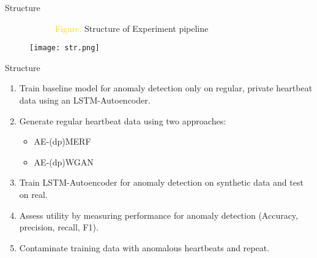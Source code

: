 \begin{frame}{Structure}
    
    \begin{figure}[h]
        \begin{flushleft}
            ~~~~~~\textcolor{gold}{Figure: }Structure of Experiment pipeline
        \end{flushleft}
        \centering
        \texttt{[image: str.png]}
    \end{figure}
\end{frame}

\begin{frame}{Structure}
    \begin{enumerate}
        \item<1-> Train \alert{baseline model} for anomaly detection only on \alert{regular, private heartbeat data} using an LSTM-Autoencoder.
        \item<2->  \alert{Generate regular heartbeat} data using two approaches:
        \begin{itemize}
            \item<2-> [--] AE-(dp)MERF
            \item<2-> [--] AE-(dp)WGAN
        \end{itemize}
        \item<3->  Train LSTM-Autoencoder for \alert{anomaly detection on synthetic data} and \alert{test on real}.
        \item<3-> Assess \alert{utility} by measuring performance for anomaly detection (Accuracy, precision, recall, F1). 
        \item<4->  \alert{Contaminate} training data with anomalous heartbeats and repeat.
    \end{enumerate}
\end{frame}


